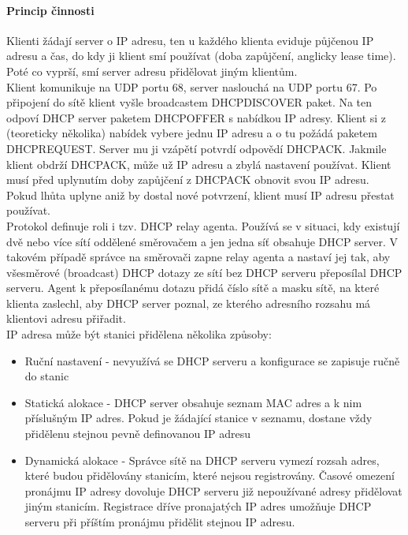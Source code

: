 \documentclass[10pt,a4paper]{article}
\begin{document}
\paragraph{Princip činnosti}
Klienti žádají server o IP adresu, ten u každého klienta eviduje půjčenou IP adresu a čas, do kdy ji klient smí používat (doba zapůjčení, anglicky lease time). Poté co vyprší, smí server adresu přidělovat jiným klientům. \\
Klient komunikuje na UDP portu 68, server naslouchá na UDP portu 67. Po připojení do sítě klient vyšle broadcastem DHCPDISCOVER paket. Na ten odpoví DHCP server paketem DHCPOFFER s nabídkou IP adresy. Klient si z (teoreticky několika) nabídek vybere jednu IP adresu a o tu požádá paketem DHCPREQUEST. Server mu ji vzápětí potvrdí odpovědí DHCPACK. Jakmile klient obdrží DHCPACK, může už IP adresu a zbylá nastavení používat. Klient musí před uplynutím doby zapůjčení z DHCPACK obnovit svou IP adresu. Pokud lhůta uplyne aniž by dostal nové potvrzení, klient musí IP adresu přestat používat. \\
Protokol definuje roli i tzv. DHCP relay agenta. Používá se v situaci, kdy existují dvě nebo více sítí oddělené směrovačem a jen jedna síť obsahuje DHCP server. V takovém případě správce na směrovači zapne relay agenta a nastaví jej tak, aby všesměrové (broadcast) DHCP dotazy ze sítí bez DHCP serveru přeposílal DHCP serveru. Agent k přeposílanému dotazu přidá číslo sítě a masku sítě, na které klienta zaslechl, aby DHCP server poznal, ze kterého adresního rozsahu má klientovi adresu přiřadit. \\
IP adresa může být stanici přidělena několika způsoby:
\begin{itemize}
	\item Ruční nastavení - nevyužívá se DHCP serveru a konfigurace se zapisuje ručně do stanic
	\item Statická alokace - DHCP server obsahuje seznam MAC adres a k nim příslušným IP adres. Pokud je žádající stanice v seznamu, dostane vždy přidělenu stejnou pevně definovanou IP adresu
	\item Dynamická alokace - Správce sítě na DHCP serveru vymezí rozsah adres, které budou přidělovány stanicím, které nejsou registrovány. Časové omezení pronájmu IP adresy dovoluje DHCP serveru již nepoužívané adresy přidělovat jiným stanicím. Registrace dříve pronajatých IP adres umožňuje DHCP serveru při příštím pronájmu přidělit stejnou IP adresu.
\end{itemize}
\end{document}

